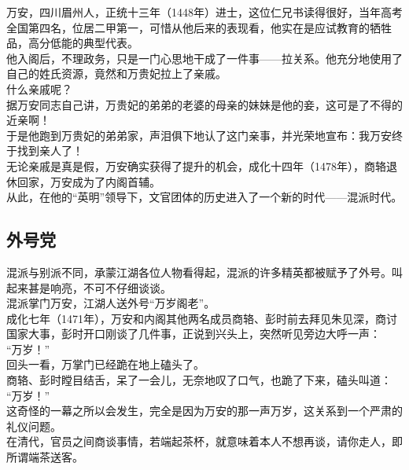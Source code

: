 \begin{multicols}{\theparacolNo}
万安，四川眉州人，正统十三年（1448年）进士，这位仁兄书读得很好，当年高考全国第四名，位居二甲第一，可惜从他后来的表现看，他实在是应试教育的牺牲品，高分低能的典型代表。\\

他入阁后，不理政务，只是一门心思地干成了一件事——拉关系。他充分地使用了自己的姓氏资源，竟然和万贵妃拉上了亲戚。\\

什么亲戚呢？\\

据万安同志自己讲，万贵妃的弟弟的老婆的母亲的妹妹是他的妾，这可是了不得的近亲啊！\\

于是他跑到万贵妃的弟弟家，声泪俱下地认了这门亲事，并光荣地宣布：我万安终于找到亲人了！\\

无论亲戚是真是假，万安确实获得了提升的机会，成化十四年（1478年），商辂退休回家，万安成为了内阁首辅。\\

从此，在他的“英明”领导下，文官团体的历史进入了一个新的时代——混派时代。\\

\subsection{外号党}
混派与别派不同，承蒙江湖各位人物看得起，混派的许多精英都被赋予了外号。叫起来甚是响亮，不可不仔细谈谈。\\

混派掌门万安，江湖人送外号“万岁阁老”。\\

成化七年（1471年），万安和内阁其他两名成员商辂、彭时前去拜见朱见深，商讨国家大事，彭时开口刚谈了几件事，正说到兴头上，突然听见旁边大呼一声：\\

“万岁！”\\

回头一看，万掌门已经跪在地上磕头了。\\

商辂、彭时瞠目结舌，呆了一会儿，无奈地叹了口气，也跪了下来，磕头叫道：\\

“万岁！”\\

这奇怪的一幕之所以会发生，完全是因为万安的那一声万岁，这关系到一个严肃的礼仪问题。\\

在清代，官员之间商谈事情，若端起茶杯，就意味着本人不想再谈，请你走人，即所谓端茶送客。\\


\end{multicols}
